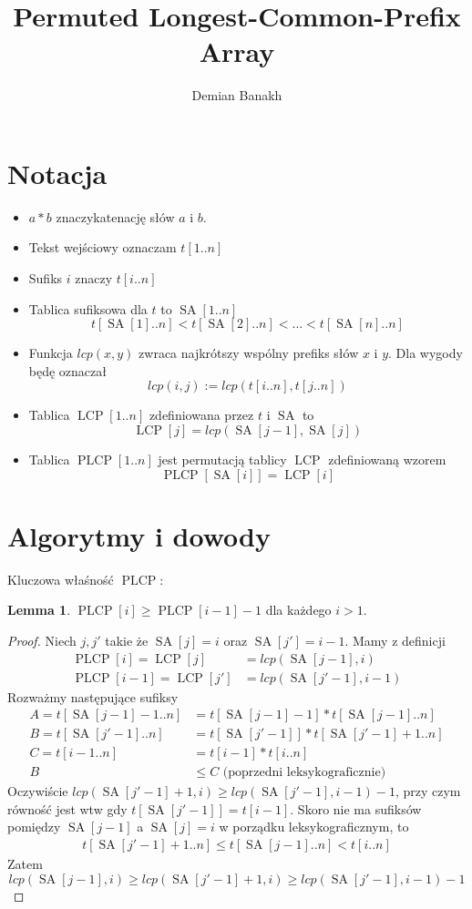 \documentclass[a4paper,12pt]{article}
\title{Permuted Longest-Common-Prefix Array}
\author{Demian Banakh}
\date{}
\theoremstyle{definition}
\newtheorem{lemma}{Lemma}[section]
\DeclareMathOperator{\SA}{SA}
\DeclareMathOperator{\LCP}{LCP}
\DeclareMathOperator{\PLCP}{PLCP}
\begin{document}
\maketitle

\section{Notacja}

\begin{itemize}
\item $a * b$ znaczykatenację słów $a$ i $b$.
\item Tekst wejściowy oznaczam $t[1..n]$
\item Sufiks $i$ znaczy $t[i..n]$
\item Tablica sufiksowa dla $t$ to $\SA[1..n]$
\[
t[\SA[1]..n] < t[\SA[2]..n] < \dots < t[\SA[n]..n]
\]
\item Funkcja $lcp(x, y)$ zwraca najkrótszy wspólny prefiks słów $x$ i $y$. Dla wygody będę oznaczał
\[
lcp(i, j) := lcp(t[i..n], t[j..n])
\]
\item Tablica $\LCP[1..n]$ zdefiniowana przez $t$ i $\SA$ to
\[
\LCP[j] = lcp(\SA[j - 1], \SA[j])
\]
\item Tablica $\PLCP[1..n]$ jest permutacją tablicy $\LCP$ zdefiniowaną wzorem
\begin{equation*}
\PLCP[\SA[i]] = \LCP[i]
\end{equation*}
\end{itemize}

\section{Algorytmy i dowody}

Kluczowa właśność $\PLCP$:
\begin{lemma}
$\PLCP[i] \ge \PLCP[i - 1] - 1$ dla każdego $i > 1$.
\begin{proof}
Niech $j, j'$ takie że $\SA[j] = i$ oraz $\SA[j'] = i - 1$. Mamy z definicji
\begin{align*}
\PLCP[i] = \LCP[j] &= lcp(\SA[j - 1], i) \\
\PLCP[i - 1] = \LCP[j'] &= lcp(\SA[j' - 1], i - 1)
\end{align*}
Rozważmy następujące sufiksy
\begin{align*}
A = t[\SA[j - 1] - 1..n] &= t[\SA[j - 1] - 1] * t[\SA[j - 1]..n] \\
B = t[\SA[j' - 1]..n] &= t[\SA[j' - 1]] * t[\SA[j' - 1] + 1..n] \\
C = t[i - 1..n] &= t[i - 1] * t[i..n] \\
B &\le C \text{ (poprzedni leksykograficznie)}
\end{align*}
Oczywiście $lcp(\SA[j' - 1]+1, i) \ge lcp(\SA[j' - 1], i - 1) - 1$, przy czym równość jest wtw gdy $t[\SA[j' - 1]] = t[i - 1]$. Skoro nie ma sufiksów pomiędzy $\SA[j - 1]$ a $\SA[j]=i$ w porządku leksykograficznym, to
\begin{gather*}
t[\SA[j' - 1] + 1..n] \le t[\SA[j - 1]..n] < t[i..n]
\end{gather*}
Zatem
\[
lcp(\SA[j - 1], i) \ge lcp(\SA[j' - 1] + 1, i) \ge lcp(\SA[j' - 1], i - 1) - 1
\]
\end{proof}
\end{lemma}
\end{document}

